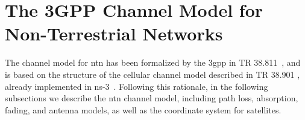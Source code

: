 



\section{The 3GPP Channel Model for Non-Terrestrial Networks}
\label{sec:channel}
The channel model for \gls{ntn} has been formalized by the \gls{3gpp} in TR 38.811~\cite{38811}, and is based on the structure of the cellular channel model described in TR 38.901 \cite{TR38901}, already implemented in ns-3~\cite{zugno20implementation}. 
Following this rationale, in the following subsections we describe the \gls{ntn} channel model, including path loss, absorption, fading, and antenna models, as well as the coordinate system for satellites. 


